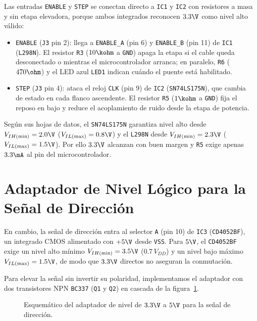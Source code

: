 Las entradas \texttt{ENABLE} y \texttt{STEP} se conectan directo a \texttt{IC1} y \texttt{IC2} con resistores a
masa y sin etapa elevadora, porque ambos integrados reconocen $3.3\V$ como nivel alto válido:

\begin{itemize}
  \item \texttt{ENABLE} (\texttt{J3} pin 2): llega a \texttt{ENABLE\_A} (pin 6) y \texttt{ENABLE\_B} (pin 11) de
    \texttt{IC1} (\texttt{L298N}). El resistor \texttt{R3} ($10\kohm$ a \texttt{GND}) apaga la etapa si el cable
    queda desconectado o mientras el microcontrolador arranca; en paralelo, \texttt{R6} ($470\ohm$) y el LED azul
    \texttt{LED1} indican cuándo el puente está habilitado.
  \item \texttt{STEP} (\texttt{J3} pin 4): ataca el reloj \texttt{CLK} (pin 9) de \texttt{IC2}
    (\texttt{SN74LS175N}), que cambia de estado en cada flanco ascendente. El resistor \texttt{R5} ($1\kohm$ a
    \texttt{GND}) fija el reposo en bajo y reduce el acoplamiento de ruido desde la etapa de potencia.
\end{itemize}

Según sus hojas de datos, el \texttt{SN74LS175N} garantiza nivel alto desde $V_{IH(\min)} = 2.0\V$
($V_{IL(\max)} = 0.8\V$) y el \texttt{L298N} desde $V_{IH(\min)} = 2.3\V$ ($V_{IL(\max)} = 1.5\V$). Por ello
$3.3\V$ alcanzan con buen margen y \texttt{R5} exige apenas $3.3\mA$ al pin del microcontrolador.

\section{Adaptador de Nivel Lógico para la Señal de Dirección}
\label{sec:adaptador_dir}

En cambio, la señal de dirección entra al selector \texttt{A} (pin 10) de \texttt{IC3} (\texttt{CD4052BF}), un
integrado CMOS alimentado con $+5\V$ desde \texttt{VSS}. Para $5\V$, el \texttt{CD4052BF} exige un nivel alto
mínimo $V_{IH(\min)} = 3.5\V$ ($0.7\,V_{DD}$) y un nivel bajo máximo $V_{IL(\max)} = 1.5\V$, de modo que $3.3\V$
directos no aseguran la conmutación.

Para elevar la señal sin invertir su polaridad, implementamos el adaptador con dos transistores NPN
\texttt{BC337} (\texttt{Q1} y \texttt{Q2}) en cascada de la figura~\ref{crkt.ej2:adaptador_nivel}.

\begin{figure}[!ht]
  \centering
  
  \caption{Esquemático del adaptador de nivel de $3.3\V$ a $5\V$ para la señal de dirección.}
  \label{crkt.ej2:adaptador_nivel}
\end{figure}

